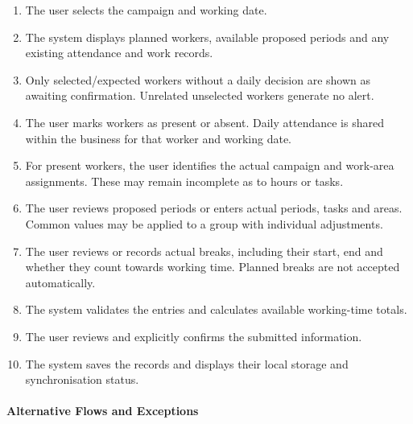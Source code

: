 \begin{enumerate}
    \item The user selects the campaign
    and working date.
    \item The system displays planned workers,
    available proposed periods and any existing
    attendance and work records.
    \item Only selected/expected workers without a daily decision are shown
    as awaiting confirmation. Unrelated unselected workers generate no alert.
    \item The user marks workers as present or absent.
    Daily attendance is shared within the business
    for that worker and working date.
    \item For present workers, the user identifies
    the actual campaign and work-area assignments.
    These may remain incomplete as to hours or tasks.
    \item The user reviews proposed periods
    or enters actual periods, tasks and areas.
    Common values may be applied to a group
    with individual adjustments.
    \item The user reviews or records actual breaks,
    including their start, end and whether
    they count towards working time.
    Planned breaks are not accepted automatically.
    \item The system validates the entries
    and calculates available working-time totals.
    \item The user reviews and explicitly
    confirms the submitted information.
    \item The system saves the records
    and displays their local storage
    and synchronisation status.
\end{enumerate}

\paragraph{Alternative Flows and Exceptions}

